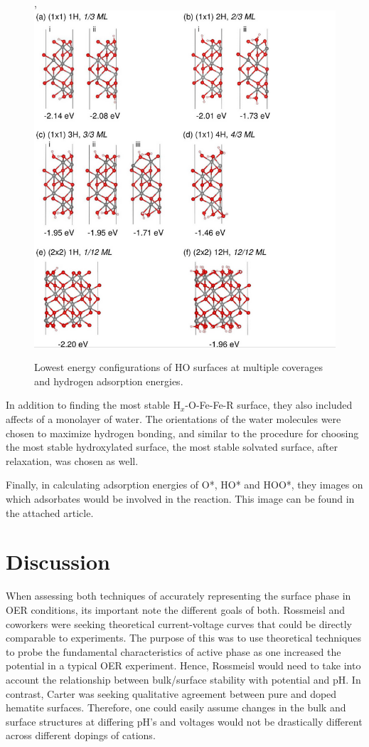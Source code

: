 \documentclass[11pt]{article}
\begin{document}
   \begin{figure}[H],
   \centering
   \includegraphics[width=4.5in]{./carter-OH.png}
   \caption{\label{fig:carter-oh}Lowest energy configurations of HO surfaces at multiple coverages and hydrogen adsorption energies.}
   \end{figure}

   In addition to finding the most stable H$_{x}$-O-Fe-Fe-R surface, they
   also included affects of a monolayer of water.
   The orientations of the water molecules were chosen to maximize
   hydrogen bonding, and similar to the procedure for choosing the most
   stable hydroxylated surface, the most stable solvated surface, after
   relaxation, was chosen as well.

   Finally, in calculating adsorption energies of O*, HO* and HOO*,
   they images on which adsorbates would be involved in the reaction.
   This image can be found in the attached article.
   
\section{Discussion}
\label{sec-3}

  When assessing both techniques of accurately representing the
  surface phase in OER conditions, its important note the different
  goals of both.
  Rossmeisl and coworkers were seeking theoretical current-voltage
  curves that could be directly comparable to experiments.
  The purpose of this was to use theoretical techniques to probe the
  fundamental characteristics of active phase
  as one increased the potential in a typical OER experiment.
  Hence, Rossmeisl would need to take into account the relationship
  between bulk/surface stability with potential and pH.
  In contrast, Carter was seeking qualitative agreement between pure
  and doped hematite surfaces.
  Therefore, one could easily assume changes in the bulk and surface
  structures at differing pH's and voltages would not be drastically
  different across different dopings of cations.
\end{document}
